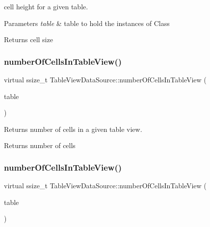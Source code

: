 cell height for a given table.


\begin{DoxyParams}{Parameters}
{\em table} & table to hold the instances of Class \\
\hline
\end{DoxyParams}
\begin{DoxyReturn}{Returns}
cell size 
\end{DoxyReturn}
\mbox{\label{classTableViewDataSource_a033505a81587ecbb3731537840451198}} 
\subsubsection{\texorpdfstring{number\+Of\+Cells\+In\+Table\+View()}{numberOfCellsInTableView()}\hspace{0.1cm}{\footnotesize\ttfamily [1/2]}}
{\footnotesize\ttfamily virtual ssize\+\_\+t Table\+View\+Data\+Source\+::number\+Of\+Cells\+In\+Table\+View (\begin{DoxyParamCaption}\item[{\hyperlink{classTableView}{Table\+View} $\ast$}]{table }\end{DoxyParamCaption})\hspace{0.3cm}{\ttfamily [pure virtual]}}

Returns number of cells in a given table view.

\begin{DoxyReturn}{Returns}
number of cells 
\end{DoxyReturn}
\mbox{\label{classTableViewDataSource_a033505a81587ecbb3731537840451198}} 
\subsubsection{\texorpdfstring{number\+Of\+Cells\+In\+Table\+View()}{numberOfCellsInTableView()}\hspace{0.1cm}{\footnotesize\ttfamily [2/2]}}
{\footnotesize\ttfamily virtual ssize\+\_\+t Table\+View\+Data\+Source\+::number\+Of\+Cells\+In\+Table\+View (\begin{DoxyParamCaption}\item[{\hyperlink{classTableView}{Table\+View} $\ast$}]{table }\end{DoxyParamCaption})\hspace{0.3cm}{\ttfamily [pure virtual]}}

